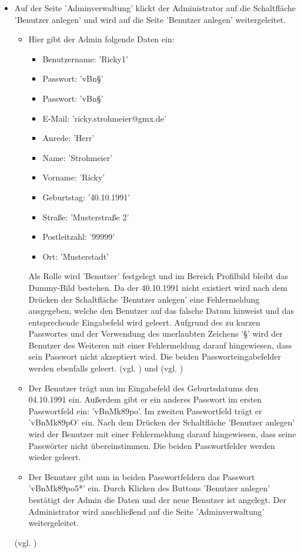 \documentclass[a4paper]{scrreprt}
\begin{document}
\begin{itemize}
				\item {} 
				 Auf der Seite 'Adminverwaltung' klickt der Administrator auf die Schaltfläche 'Benutzer anlegen' und wird auf die Seite 'Benutzer anlegen' weitergeleitet. 
					 \begin{itemize}
					 \item Hier gibt der Admin folgende Daten ein:
						\begin{itemize}
							\item Benutzername: 'Ricky1' 
							\item Passwort: 'vBn§'
							\item Passwort: 'vBn§'
							\item E-Mail: 'ricky.strohmeier@gmx.de'
							\item Anrede: 'Herr'
							\item Name: 'Strohmeier'
							\item Vorname: 'Ricky'
							\item Geburtstag: '40.10.1991'
							\item Straße: 'Musterstraße 2'
							\item Postleitzahl: '99999'
							\item Ort: 'Musterstadt'
						\end{itemize}
					 Als Rolle wird 'Benutzer' festgelegt und im Bereich Profilbild bleibt das Dummy-Bild bestehen. Da der 40.10.1991 nicht existiert wird nach dem Drücken der Schaltfläche 'Benutzer anlegen' eine Fehlermeldung ausgegeben, welche den Benutzer auf das falsche Datum hinweist und das entsprechende Eingabefeld wird geleert. Aufgrund des zu kurzen Passwortes und der Verwendung des unerlaubten Zeichens '§' wird der Benutzer des Weiteren mit einer Fehlermeldung darauf hingewiesen, dass sein Passwort nicht akzeptiert wird. Die beiden Passworteingabefelder werden ebenfalls geleert. (vgl. ) und (vgl. )
					 
					 \item Der Benutzer trägt nun im Eingabefeld des Geburtsdatums den 04.10.1991 ein. Außerdem gibt er ein anderes Passwort im ersten Passwortfeld ein: 'vBnMk89po'. Im zweiten Passwortfeld trägt er 'vBnMk89pO' ein. Nach dem Drücken der Schaltfläche 'Benutzer anlegen' wird der Benutzer mit einer Fehlermeldung darauf hingewiesen, dass seine Passwörter nicht übereinstimmen. Die beiden Passwortfelder werden wieder geleert.
					 
					 \item Der Benutzer gibt nun in beiden Passwortfeldern das Passwort 'vBnMk89po5*' ein. Durch Klicken des Buttons 'Benutzer anlegen' bestätigt der Admin die Daten und der neue Benutzer ist angelegt. Der Administrator wird anschließend auf die Seite 'Adminverwaltung' weitergeleitet.
					\end{itemize}
				(vgl. )
					

\end{itemize}
\end{document}
